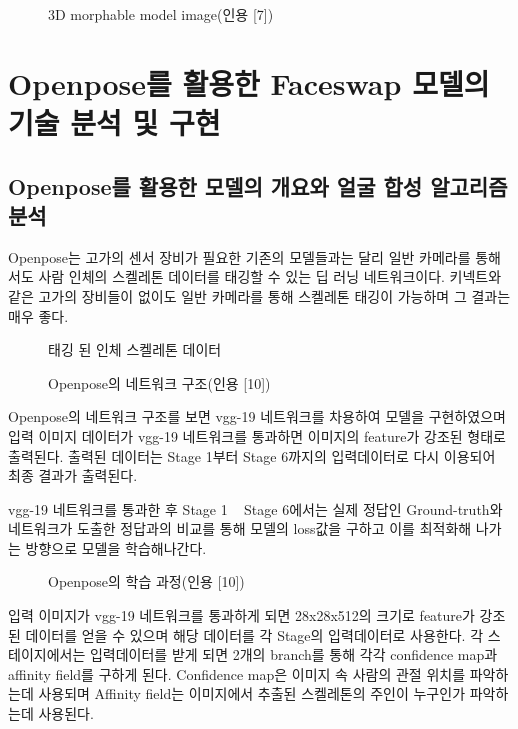 \documentclass{oblivoir}
\begin{document}
\begin{figure}[h!]
\centering
\caption{ 3D morphable model image(인용 [7])}
\end{figure}



\chapter{Openpose를 활용한 Faceswap 모델의 기술 분석 및 구현}

\section{Openpose를 활용한 모델의 개요와 얼굴 합성 알고리즘 분석}

Openpose는 고가의 센서 장비가 필요한 기존의 모델들과는 달리 일반 카메라를 통해서도 사람 인체의 스켈레톤 데이터를 태깅할 수 있는 딥 러닝 네트워크이다. 키넥트와 같은 고가의 장비들이 없이도 일반 카메라를 통해 스켈레톤 태깅이 가능하며 그 결과는 매우 좋다.

\begin{figure}[h!]
\centering
\caption{태깅 된 인체 스켈레톤 데이터}
\end{figure}

\begin{figure}[h!]
\centering
\caption{Openpose의 네트워크 구조(인용 [10])}
\end{figure}


Openpose의 네트워크 구조를 보면 vgg-19 네트워크를 차용하여 모델을 구현하였으며 입력 이미지 데이터가 vgg-19 네트워크를 통과하면 이미지의 feature가 강조된 형태로 출력된다. 출력된 데이터는 Stage 1부터 Stage 6까지의 입력데이터로 다시 이용되어 최종 결과가 출력된다.

vgg-19 네트워크를 통과한 후 Stage 1 ~ Stage 6에서는 실제 정답인 Ground-truth와 네트워크가 도출한 정답과의 비교를 통해 모델의 loss값을 구하고 이를 최적화해 나가는 방향으로 모델을 학습해나간다.

\begin{figure}[h!]
\centering
\caption{Openpose의 학습 과정(인용 [10])}
\end{figure}


입력 이미지가 vgg-19 네트워크를 통과하게 되면 28x28x512의 크기로 feature가 강조된 데이터를 얻을 수 있으며 해당 데이터를 각 Stage의 입력데이터로 사용한다. 각 스테이지에서는 입력데이터를 받게 되면 2개의 branch를 통해 각각 confidence map과 affinity field를 구하게 된다. Confidence map은 이미지 속 사람의 관절 위치를 파악하는데 사용되며 Affinity field는 이미지에서 추출된 스켈레톤의 주인이 누구인가 파악하는데 사용된다.
\end{document}
